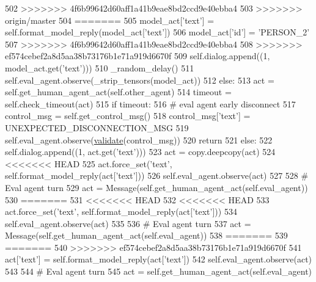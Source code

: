 \begin{DoxyCode}
502 >>>>>>> 4f6b99642d60aff1a41b9eae8bd2ccd9e40ebba4
503 >>>>>>> origin/master
504 =======
505                 model\_act[\textcolor{stringliteral}{'text'}] = self.format\_model\_reply(model\_act[\textcolor{stringliteral}{'text'}])
506                 model\_act[\textcolor{stringliteral}{'id'}] = \textcolor{stringliteral}{'PERSON\_2'}
507 >>>>>>> 4f6b99642d60aff1a41b9eae8bd2ccd9e40ebba4
508 >>>>>>> ef574cebef2a8d5aa38b73176b1e71a919d6670f
509                 self.dialog.append((1, model\_act.get(\textcolor{stringliteral}{'text'})))
510                 \_random\_delay()
511                 self.eval\_agent.observe(\_strip\_tensors(model\_act))
512             \textcolor{keywordflow}{else}:
513                 act = self.get\_human\_agent\_act(self.other\_agent)
514                 timeout = self.check\_timeout(act)
515                 \textcolor{keywordflow}{if} timeout:
516                     \textcolor{comment}{# eval agent early disconnect}
517                     control\_msg = self.get\_control\_msg()
518                     control\_msg[\textcolor{stringliteral}{'text'}] = UNEXPECTED\_DISCONNECTION\_MSG
519                     self.eval\_agent.observe(\hyperlink{namespaceparlai_1_1core_1_1worlds_afc3fad603b7bce41dbdc9cdc04a9c794}{validate}(control\_msg))
520                     \textcolor{keywordflow}{return}
521                 \textcolor{keywordflow}{else}:
522                     self.dialog.append((1, act.get(\textcolor{stringliteral}{'text'})))
523                     act = copy.deepcopy(act)
524 <<<<<<< HEAD
525                     act.force\_set(\textcolor{stringliteral}{'text'}, self.format\_model\_reply(act[\textcolor{stringliteral}{'text'}]))
526                     self.eval\_agent.observe(act)
527 
528         \textcolor{comment}{# Eval agent turn}
529         act = Message(self.get\_human\_agent\_act(self.eval\_agent))
530 =======
531 <<<<<<< HEAD
532 <<<<<<< HEAD
533                     act.force\_set(\textcolor{stringliteral}{'text'}, self.format\_model\_reply(act[\textcolor{stringliteral}{'text'}]))
534                     self.eval\_agent.observe(act)
535 
536         \textcolor{comment}{# Eval agent turn}
537         act = Message(self.get\_human\_agent\_act(self.eval\_agent))
538 =======
539 =======
540 >>>>>>> ef574cebef2a8d5aa38b73176b1e71a919d6670f
541                     act[\textcolor{stringliteral}{'text'}] = self.format\_model\_reply(act[\textcolor{stringliteral}{'text'}])
542                     self.eval\_agent.observe(act)
543 
544         \textcolor{comment}{# Eval agent turn}
545         act = self.get\_human\_agent\_act(self.eval\_agent)

\end{DoxyCode}
